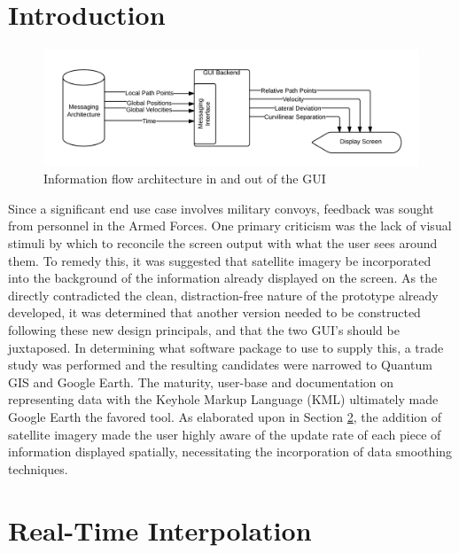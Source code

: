 \documentclass[12pt]{report}
\begin{document}
\section{Introduction} \label{sec:guiintro}


\begin{figure}[ht] \label{fig:blackboxflow} \centering
    \includegraphics[width=6.5in]{./figs/blackbox_flowchart.png}
    \caption{Information flow architecture in and out of the GUI}
\end{figure}


Since a significant end use case involves military convoys, feedback was sought from personnel in the Armed Forces. One primary criticism was the lack of visual stimuli by which to reconcile the screen output with what the user sees around them. To remedy this, it was suggested that satellite imagery be incorporated into the background of the information already displayed on the screen. As the directly contradicted the clean, distraction-free nature of the prototype already developed, it was determined that another version needed to be constructed following these new design principals, and that the two GUI's should be juxtaposed. In determining what software package to use to supply this, a trade study was performed and the resulting candidates were narrowed to Quantum GIS and Google Earth. The maturity, user-base and documentation on representing data with the Keyhole Markup Language (KML) ultimately made Google Earth the favored tool. As elaborated upon in Section \ref{sec:interp}, the addition of satellite imagery made the user highly aware of the update rate of each piece of information displayed spatially, necessitating the incorporation of data smoothing techniques.

\section{Real-Time Interpolation} \label{sec:interp}
\end{document}
